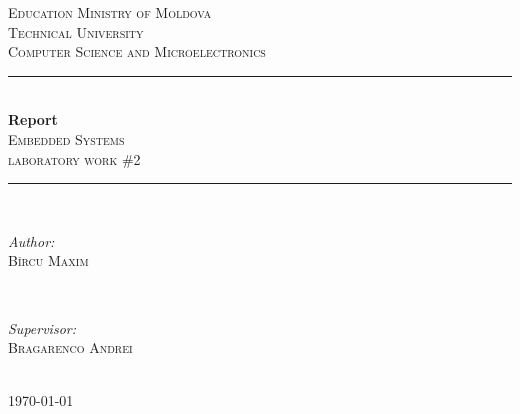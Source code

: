 \begin{titlepage}
\newcommand{\HRule}{\rule{\linewidth}{0.5mm}} 
\center
 

\textsc{\LARGE Education Ministry of Moldova}\\[1.5cm] 
\textsc{\Large Technical University}\\[0.5cm] 
\textsc{\large Computer Science and Microelectronics}\\[0.5cm]


\HRule \\[0.4cm]
{ \Huge \bfseries Report}\\[0.4cm]
\textsc{\large Embedded Systems}\\[0.5cm]
\textsc{ 
laboratory work \#2}\\[0.5cm]
\HRule \\[1.5cm]
 

\begin{minipage}{0.4\textwidth}
\begin{flushleft} \large
\emph{Author:}\\
\textsc{Bîrcu Maxim} %
\end{flushleft}
\end{minipage}
~
\begin{minipage}{0.4\textwidth}
\begin{flushright} \large
\emph{Supervisor:} \\
\textsc{Bragarenco Andrei} %
\end{flushright}
\end{minipage}\\[2cm]


\vfill
{\large \today}\\[2cm] %
\clearpage
 
\end{titlepage}
